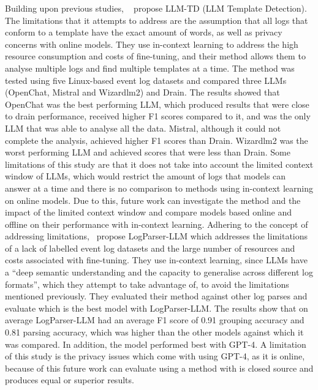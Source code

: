 Building upon previous studies, ~\cite{vaarandi2024using} propose LLM-TD (LLM Template Detection). The limitations that it attempts to address are the assumption that all logs that conform to a template have the exact amount of words, as well as privacy concerns with online models. They use in-context learning to address the high resource consumption and costs of fine-tuning, and their method allows them to analyse multiple logs and find multiple templates at a time. The method was tested using five Linux-based event log datasets and compared three LLMs (OpenChat, Mistral and Wizardlm2) and Drain. The results showed that OpenChat was the best performing LLM, which produced results that were close to drain performance, received higher F1 scores compared to it, and was the only LLM that was able to analyse all the data. Mistral, although it could not complete the analysis, achieved higher F1 scores than Drain. Wizardlm2 was the worst performing LLM and achieved scores that were less than Drain. Some limitations of this study are that it does not take into account the limited context window of LLMs, which would restrict the amount of logs that models can answer at a time and there is no comparison to methods using in-context learning on online models. Due to this, future work can investigate the method and the impact of the limited context window and compare models based online and offline on their performance with in-context learning. Adhering to the concept of addressing limitations,~\cite{zhong2024logparser} propose LogParser-LLM which addresses the limitations of a lack of labelled event log datasets and the large number of resources and costs associated with fine-tuning. They use in-context learning, since LLMs have a ``deep semantic understanding and the capacity to generalise across different log formats'', which they attempt to take advantage of, to avoid the limitations mentioned previously. They evaluated their method against other log parses and evaluate which is the best model with LogParser-LLM. The results show that on average LogParser-LLM had an average F1 score of 0.91 grouping accuracy and 0.81 parsing accuracy, which was higher than the other models against which it was compared. In addition, the model performed best with GPT-4. A limitation of this study is the privacy issues which come with using GPT-4, as it is online, because of this future work can evaluate using a method with is closed source and produces equal or superior results.

